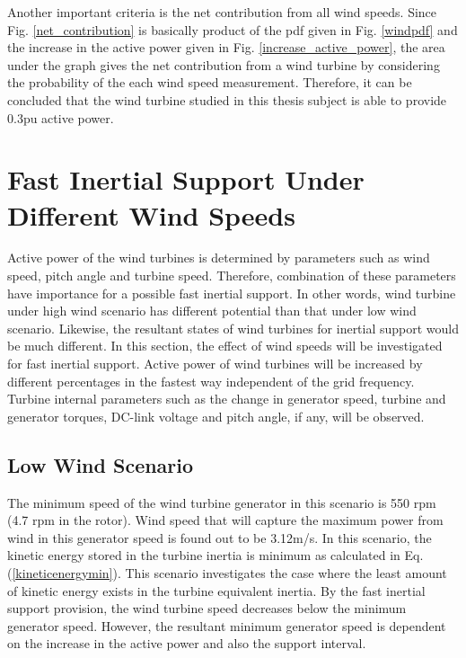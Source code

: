 Another important criteria is the net contribution from all wind speeds. Since Fig. \ref{net_contribution} is basically product of the pdf given in Fig. \ref{windpdf} and the increase in the active power given in Fig. \ref{increase_active_power}, the area under the graph gives the net contribution from a wind turbine by considering the probability of the each wind speed measurement. Therefore, it can be concluded that the wind turbine studied in this thesis subject is able to provide 0.3pu active power.
\section{Fast Inertial Support Under Different Wind Speeds}
Active power of the wind turbines is determined by parameters such as wind speed, pitch angle and turbine speed. Therefore, combination of these parameters have importance for a possible fast inertial support. In other words, wind turbine under high wind scenario has different potential than that under low wind scenario. Likewise, the resultant states of wind turbines for inertial support would be much different. In this section, the effect of wind speeds will be investigated for fast inertial support. Active power of wind turbines will be increased by different percentages in the fastest way independent of the grid frequency. Turbine internal parameters such as the change in generator speed, turbine and generator torques, DC-link voltage and pitch angle, if any, will be observed. 
\subsection{Low Wind Scenario}
\label{sec:lowwind}
The minimum speed of the wind turbine generator in this scenario is 550 rpm (4.7 rpm in the rotor). Wind speed that will capture the maximum power from wind in this generator speed is found out to be 3.12m/s. In this scenario, the kinetic energy stored in the turbine inertia is minimum as calculated in Eq. (\ref{kineticenergymin}). This scenario investigates the case where the least amount of kinetic energy exists in the turbine equivalent inertia. By the fast inertial support provision, the wind turbine speed decreases below the minimum generator speed. However, the resultant minimum generator speed is dependent on the increase in the active power and also the support interval.
